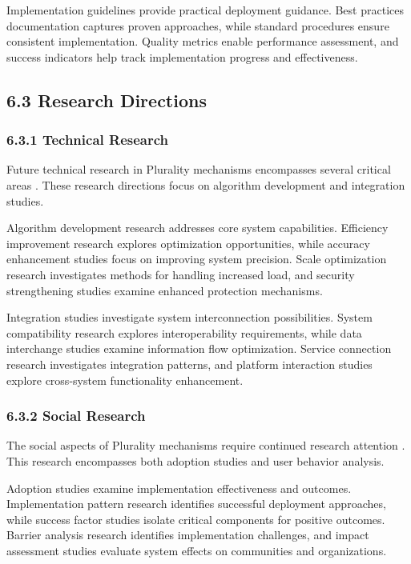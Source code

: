 Implementation guidelines provide practical deployment guidance. Best practices documentation captures proven approaches, while standard procedures ensure consistent implementation. Quality metrics enable performance assessment, and success indicators help track implementation progress and effectiveness.

\hypertarget{research-directions}{%
\subsection{6.3 Research Directions}\label{research-directions}}

\hypertarget{technical-research}{%
\subsubsection{6.3.1 Technical Research}\label{technical-research}}

Future technical research in Plurality mechanisms encompasses several critical areas \citep{buterin2019flexible}. These research directions focus on algorithm development and integration studies.

Algorithm development research addresses core system capabilities. Efficiency improvement research explores optimization opportunities, while accuracy enhancement studies focus on improving system precision. Scale optimization research investigates methods for handling increased load, and security strengthening studies examine enhanced protection mechanisms.

Integration studies investigate system interconnection possibilities. System compatibility research explores interoperability requirements, while data interchange studies examine information flow optimization. Service connection research investigates integration patterns, and platform interaction studies explore cross-system functionality enhancement.

\hypertarget{social-research}{%
\subsubsection{6.3.2 Social Research}\label{social-research}}

The social aspects of Plurality mechanisms require continued research attention \citep{weyl2022decentralized}. This research encompasses both adoption studies and user behavior analysis.

Adoption studies examine implementation effectiveness and outcomes. Implementation pattern research identifies successful deployment approaches, while success factor studies isolate critical components for positive outcomes. Barrier analysis research identifies implementation challenges, and impact assessment studies evaluate system effects on communities and organizations.

